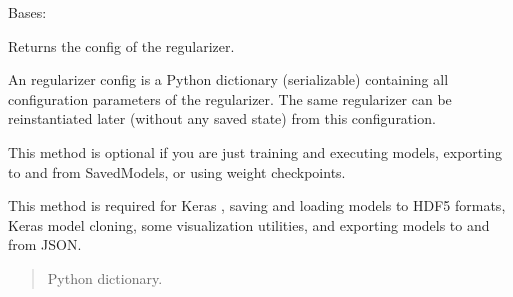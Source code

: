 \documentclass[letterpaper,10pt,english]{sphinxmanual}
\begin{document}
\begin{fulllineitems}
\label{\detokenize{index:TRAPT.DLFS.SparseGroupLasso}}
\pysigstartsignatures
{}
\pysigstopsignatures
\sphinxAtStartPar
Bases: 

\begin{fulllineitems}
\label{\detokenize{index:TRAPT.DLFS.SparseGroupLasso.get_config}}
\pysigstartsignatures
{}
\pysigstopsignatures
\sphinxAtStartPar
Returns the config of the regularizer.

\sphinxAtStartPar
An regularizer config is a Python dictionary (serializable)
containing all configuration parameters of the regularizer.
The same regularizer can be reinstantiated later
(without any saved state) from this configuration.

\sphinxAtStartPar
This method is optional if you are just training and executing models,
exporting to and from SavedModels, or using weight checkpoints.

\sphinxAtStartPar
This method is required for Keras , saving and
loading models to HDF5 formats, Keras model cloning, some visualization
utilities, and exporting models to and from JSON.
\begin{quote}\begin{description}
\sphinxAtStartPar
Python dictionary.

\end{description}\end{quote}

\end{fulllineitems}


\end{fulllineitems}


\begin{fulllineitems}
\label{\detokenize{index:TRAPT.DLFS.seed_tensorflow}}
\pysigstartsignatures
{}
\pysigstopsignatures
\end{fulllineitems}
\end{document}
